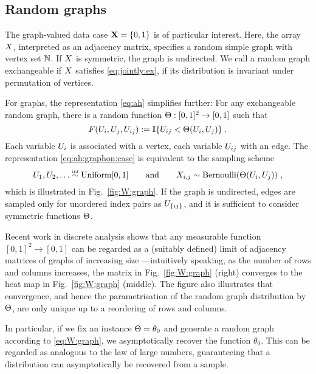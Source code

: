 \subsection{Random graphs}

The graph-valued data case $\mathbf{X}=\lbrace{0,1}\rbrace$ is of particular interest. Here, the array $X$, interpreted as 
an adjacency matrix, specifies a random simple graph with vertex set $\mathbb{N}$. If $X$ is symmetric, the graph is undirected. We call a 
random graph exchangeable if $X$ satisfies \eqref{eq:jointly:ex}, \ie if its distribution is invariant under permutation of vertices.

For graphs, the representation \eqref{eq:ah} simplifies further:
For any exchangeable random graph, there is a random
function ${\Theta:[0,1]^2\rightarrow[0,1]}$ such that
\begin{equation}
  \label{eq:ah:graphon:case}
  F(U_i,U_j,U_{ij}):=\mathbb{I}\lbrace U_{ij} < \Theta(U_i,U_j)\rbrace\;.
\end{equation}
Each variable $U_i$ is associated with a vertex, each variable $U_{ij}$ with an edge. 
The representation \eqref{eq:ah:graphon:case} is equivalent to the sampling scheme
\begin{equation}
  \label{eq:W:graph}
  U_1,U_2,\dots\overset{\mbox{\tiny iid}}{\sim}\mbox{\rm Uniform}[0,1]\qquad\text{and}\qquad X_{i,j}\sim\mbox{\rm Bernoulli}(\Theta(U_i,U_j))\;,
\end{equation}
which is illustrated in Fig.~\ref{fig:W:graph}. If the graph is undirected, edges are sampled only for unordered index pairs as $U_{\lbrace ij\rbrace}$,
and it is sufficient to consider symmetric functions $\Theta$.

Recent work in discrete analysis shows that any measurable function $[0,1]^2\rightarrow[0,1]$ can be regarded as a (suitably defined) limit of adjacency matrices of graphs of increasing size \citep{Lovasz2004-hc}---intuitively speaking, 
as the number of rows and columns increases, the
matrix in Fig.~\ref{fig:W:graph} (right) converges to the heat map in Fig.~\ref{fig:W:graph} (middle).
The figure also illustrates that convergence, and hence the parametrisation of the random graph distribution
by $\Theta$, are only unique up to a reordering of rows and columns.

In particular, if we fix an instance ${\Theta=\theta_0}$ and generate a random graph according to \eqref{eq:W:graph},
we asymptotically recover the function $\theta_0$. This can be regarded as analogous to the law of large
numbers, guaranteeing that a distribution can asymptotically be recovered from a sample.

